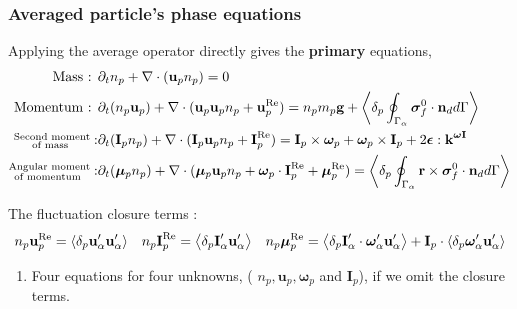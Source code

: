 \documentclass{sintefbeamer}
\begin{document}
\begin{frame}
  \frametitle{Averaged particle's phase equations}
Applying the average operator directly gives the \textbf{primary}  equations, 
  \begin{align*} 
    \text{Mass :   }
    &
    \partial_t n_p + \mathbf{\nabla}\cdot (\textbf{u}_p n_p)
    = 
    0\\
    \text{Momentum :   }
    &
    \partial_t (n_p\textbf{u}_p) + \mathbf{\nabla}\cdot (\textbf{u}_p\textbf{u}_p n_p+ \textbf{u}^\text{Re}_p)
    = 
    n_pm_p\textbf{g}
    + \left<\delta_p \oint_{\Gamma_{\alpha}} \bm{\sigma}_f^0 \cdot \textbf{n}_d d\Gamma\right>
    \\
    \substack{\text{Second moment} \\ \text{of mass }} : 
    &
    \partial_t (\textbf{I}_p n_p )+ \mathbf{\nabla}\cdot (\textbf{I}_p\textbf{u}_p  n_p + \textbf{I}^\text{Re}_p)
    = \textbf{I}_p \times \bm\omega_p+ \bm\omega_p \times \textbf{I}_p + 2\bm\epsilon : \textbf{k}^{\bm\omega \textbf{I}}\\
    \substack{\text{Angular  moment} \\ \text{of momentum }} : 
    &
    \partial_t (\bm\mu_p n_p)+ \mathbf{\nabla}\cdot (\bm\mu_p \textbf{u}_p  n_p + \bm\omega_p\cdot\textbf{I}^\text{Re}_p + \bm\mu_p^\text{Re})
    =  
     \left<\delta_p \oint_{\Gamma_{\alpha}}  \textbf{r}\times\bm{\sigma}_f^0\cdot \textbf{n}_d d\Gamma\right>
  \end{align*}

  The fluctuation closure terms : 
  \begin{align*}
    n_p \textbf{u}_{p}^\text{Re}
    =
    \left<\delta_p \textbf{u}_\alpha' \textbf{u}_{\alpha}'\right>
    &&
    n_p \textbf{I}_{p}^\text{Re}
    =
    \left<\delta_p \textbf{I}_\alpha' \textbf{u}_{\alpha}'\right>
    &&
    n_p \bm\mu_{p}^\text{Re}
    = 
    \left<\delta_p \textbf{I}'_\alpha\cdot \bm\omega'_\alpha \textbf{u}_\alpha'\right> 
    + \textbf{I}_p \cdot \left<\delta_p \bm\omega_\alpha' \textbf{u}_\alpha'\right>
\end{align*}
\begin{enumerate}
  \item Four equations for four unknowns, ( $n_p, \textbf{u}_p, \bm\omega_p$ and $\textbf{I}_p$), if we omit the closure terms. 
\end{enumerate}
\end{frame}
\end{document}
